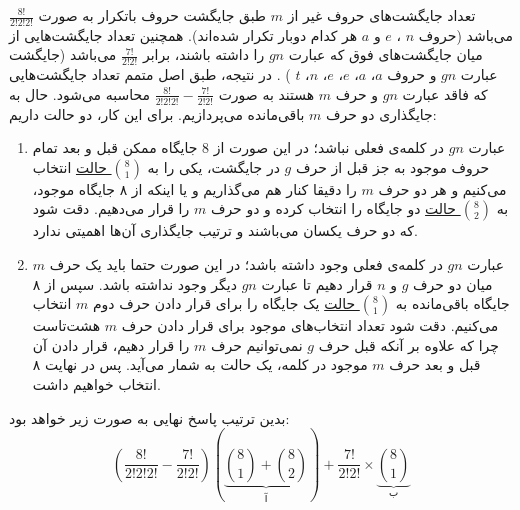 \p
تعداد جایگشت‌های حروف غیر از $m$
طبق جایگشت‌ حروف باتکرار به صورت 
$\frac{8!}{2!2!2!}$
می‌باشد
(حروف $n$ ، $e$ و $a$ هر کدام دوبار تکرار شده‌اند).
 همچنین تعداد جایگشت‌هایی از میان جایگشت‌های فوق که عبارت
 $gn$ 
 را داشته باشند، برابر
 \underline{$\frac{7!}{2!2!}$} 
  می‌باشد 
  (جایگشت عبارت
  $gn$
  و حروف
  $a$، 
  $a$، 
  $e$، 
  $e$، 
  $n$، 
  $t$
  )
  . 
 در نتیجه، طبق اصل متمم تعداد جایگشت‌هایی که فاقد عبارت 
  $gn$
  و حرف 
  $m$   
  هستند به صورت  
  \underline{$\frac{8!}{2!2!2!} - \frac{7!}{2!2!}$} 
  محاسبه می‌شود.
حال به جایگذاری دو حرف 
$m$
 باقی‌مانده می‌پردازیم. برای این کار، دو حالت داریم:
\begin{enumerate}
  \item 
  عبارت 
  $gn$ 
 در کلمه‌ی فعلی نباشد؛
 در این صورت از 8 جایگاه ممکن 
  قبل و بعد تمام حروف موجود به جز قبل از حرف $g$ در جایگشت، 
یکی را به 
\underline{${8\choose 1}$ حالت}
 انتخاب می‌کنیم و هر دو حرف $m$ را دقیقا کنار هم می‌گذاریم
 و یا اینکه از ۸ جایگاه موجود، به 
\underline{${8\choose 2}$ حالت}
دو جایگاه را انتخاب کرده و دو حرف
 $m$
 را قرار می‌دهیم.
دقت شود که دو حرف یکسان می‌باشند و ترتیب جایگذاری آن‌ها اهمیتی ندارد.

  \item
  عبارت $gn$ 
  در کلمه‌ی فعلی وجود داشته ‌باشد؛
  در این صورت حتما باید یک حرف $m$ میان دو حرف 
  $g$ و $n$ قرار دهیم تا عبارت $gn$ دیگر وجود نداشته باشد.
  سپس از ۸ جایگاه باقی‌مانده به 
  \underline{${8\choose 1}$ حالت}
  یک جایگاه را برای قرار دادن حرف دوم $m$ انتخاب می‌کنیم. دقت شود تعداد انتخاب‌های موجود برای قرار دادن حرف $m$ هشت‌تاست چرا که علاوه بر آنکه قبل حرف $g$ نمی‌توانیم حرف $m$ را قرار دهیم، قرار دادن آن قبل و بعد حرف $m$ موجود در کلمه، یک حالت به شمار می‌آید. پس در نهایت ۸ انتخاب خواهیم داشت.
  
\end{enumerate}
\p
بدین ترتیب پاسخ نهایی به صورت زیر خواهد بود:
$$(\frac{8!}{2!2!2!} - \frac{7!}{2!2!})(\underbrace{{8\choose 1} + {8\choose 2}}_{\text{آ}}) + \frac{7!}{2!2!} \times \underbrace{{8\choose 1}}_{\text{ب}}$$
